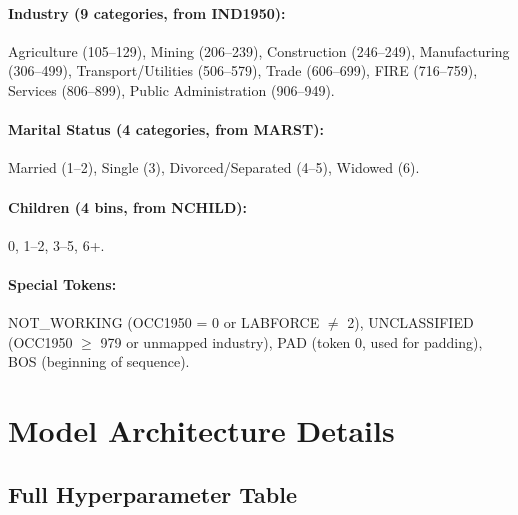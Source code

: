 \documentclass[12pt]{article}
\begin{document}
\paragraph{Industry (9 categories, from IND1950):}
Agriculture (105--129), Mining (206--239), Construction (246--249), Manufacturing (306--499), Transport/Utilities (506--579), Trade (606--699), FIRE (716--759), Services (806--899), Public Administration (906--949).

\paragraph{Marital Status (4 categories, from MARST):}
Married (1--2), Single (3), Divorced/Separated (4--5), Widowed (6).

\paragraph{Children (4 bins, from NCHILD):}
0, 1--2, 3--5, 6+.

\paragraph{Special Tokens:}
NOT\_WORKING (OCC1950 = 0 or LABFORCE $\neq$ 2), UNCLASSIFIED (OCC1950 $\geq$ 979 or unmapped industry), PAD (token 0, used for padding), BOS (beginning of sequence).


\section{Model Architecture Details}\label{app:architecture}

\subsection{Full Hyperparameter Table}
\end{document}
